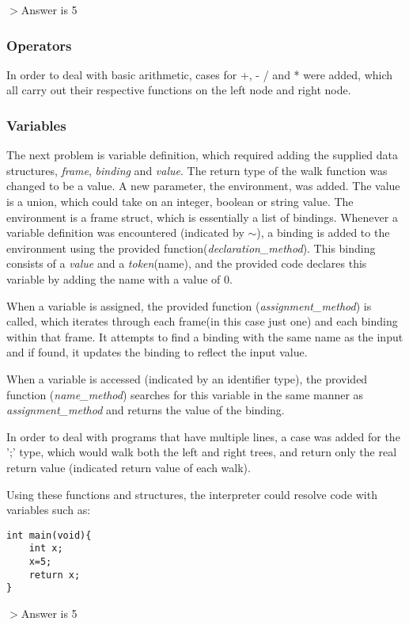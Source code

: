 \documentclass[11pt]{article}
\begin{document}
$>$Answer is 5

\subsubsection{Operators}
In order to deal with basic arithmetic, cases for +, - / and * were added, which all carry out their respective functions on the left node and right node. 

\subsubsection{Variables}
The next problem is variable definition, which required adding the supplied data structures, \emph{frame}, \emph{binding} and \emph{value}. The return type of the walk function was changed to be a value. A new parameter, the environment, was added. The value is a union, which could take on an integer, boolean or string value. The environment is a frame struct, which is essentially a list of bindings. Whenever a variable definition was encountered (indicated by $\sim$), a binding is added to the environment using the provided function(\emph{declaration\_method}). This binding consists of a \emph{value} and a \emph{token}(name), and the provided code declares this variable by adding the name with a value of 0. 

When a variable is assigned, the provided function (\emph{assignment\_method}) is called, which iterates through each frame(in this case just one) and each binding within that frame. It attempts to find a binding with the same name as the input and if found, it updates the binding to reflect the input value.

When a variable is accessed (indicated by an identifier type), the provided function (\emph{name\_method}) searches for this variable in the same manner as \emph{assignment\_method} and returns the value of the binding. 

In order to deal with programs that have multiple lines, a case was added for the ';' type, which would walk both the left and right trees, and return only the real return value (indicated return value of each walk). 

Using these functions and structures, the interpreter could resolve code with variables such as:
\begin{lstlisting}
int main(void){
	int x;
	x=5;
 	return x;
}
\end{lstlisting}
$>$Answer is 5
\\
\end{document}

